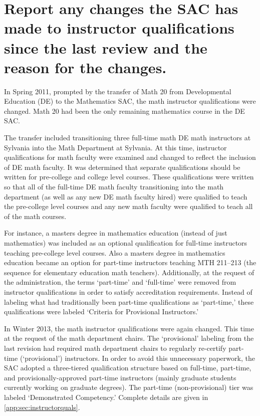 \section{Report any changes the SAC has made to instructor qualifications since the last review and the reason for the changes.}
In Spring 2011, prompted by the transfer of Math 20 from Developmental Education (DE) to the Mathematics SAC, the math instructor qualifications were changed.  Math 20 had been the only remaining mathematics course in the DE SAC.  

The transfer included transitioning three full-time math DE math instructors at Sylvania into the Math Department at Sylvania.  At this time, instructor qualifications for math faculty were examined and changed to reflect the inclusion of DE math faculty.  It was determined that separate qualifications should be written for pre-college and college level courses.  These qualifications were written so that all of the full-time DE math faculty transitioning into the math department (as well as any new DE math faculty hired) were qualified to teach the pre-college level courses and any new math faculty were qualified to teach all of the math courses.  

For instance, a masters degree in mathematics education (instead of just mathematics) was included as an optional qualification for full-time instructors teaching pre-college level courses.  Also a masters degree in mathematics education became an option for part-time instructors teaching MTH 211--213 (the sequence for elementary education math teachers).  Additionally, at the request of the administration, the terms `part-time' and `full-time' were removed from instructor qualifications in order to satisfy accreditation requirements.  Instead of labeling what had traditionally been part-time qualifications as `part-time,' these qualifications were labeled `Criteria for Provisional Instructors.'

In Winter 2013, the math instructor qualifications were again changed.  This time at the request of the math department chairs.  The `provisional' labeling from the last revision had required math department chairs to regularly re-certify part-time (`provisional') instructors.  In order to avoid this unnecessary paperwork, the SAC adopted a three-tiered qualification structure based on full-time, part-time, and provisionally-approved part-time instructors (mainly graduate students currently working on graduate degrees).  The part-time (non-provisional) tier was labeled `Demonstrated Competency.' Complete details are given in \vref{app:sec:instructorquals}.
